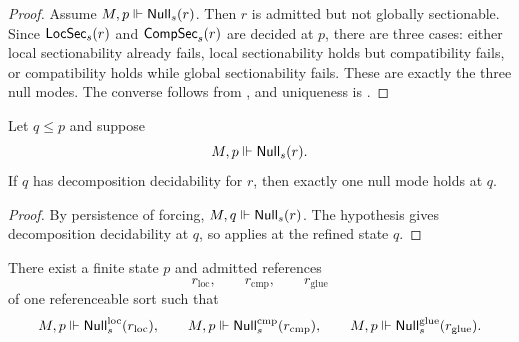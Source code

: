 \begin{proof}
Assume $M,p\Vdash \mathsf{Null}_s(r)$. Then $r$ is admitted but not globally sectionable. Since $\mathsf{LocSec}_s(r)$ and $\mathsf{CompSec}_s(r)$ are decided at $p$, there are three cases: either local sectionability already fails, local sectionability holds but compatibility fails, or compatibility holds while global sectionability fails. These are exactly the three null modes. The converse follows from , and uniqueness is .
\end{proof}

\begin{theorem}\label{thm:null-classification-under-refinement}
Let $q\le p$ and suppose
\[
M,p\Vdash \mathsf{Null}_s(r).
\]
If $q$ has decomposition decidability for $r$, then exactly one null mode holds at $q$.
\end{theorem}

\begin{proof}
By persistence of forcing, $M,q\Vdash \mathsf{Null}_s(r)$. The hypothesis gives decomposition decidability at $q$, so  applies at the refined state $q$.
\end{proof}

\begin{proposition}\label{prop:finite-three-mode-model}
There exist a finite state $p$ and admitted references
\[
r_{\mathrm{loc}},\qquad r_{\mathrm{cmp}},\qquad r_{\mathrm{glue}}
\]
of one referenceable sort such that
\[
M,p\Vdash \mathsf{Null}^{\mathrm{loc}}_s(r_{\mathrm{loc}}),\qquad
M,p\Vdash \mathsf{Null}^{\mathrm{cmp}}_s(r_{\mathrm{cmp}}),\qquad
M,p\Vdash \mathsf{Null}^{\mathrm{glue}}_s(r_{\mathrm{glue}}).
\]
\end{proposition}

